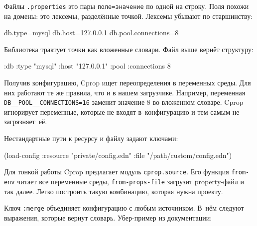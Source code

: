 
\begin{english}
\end{english}

Файлы \verb|.properties| это пары \verb|поле=значение| по одной на
строку. Поля похожи на домены: это лексемы, разделённые точкой. Лексемы убывают
по старшинству:

\begin{english}
  \begin{ini}
db.type=mysql
db.host=127.0.0.1
db.pool.connections=8
  \end{ini}
\end{english}

Библиотека трактует точки как вложенные словари. Файл выше вернёт структуру:

\begin{english}
  \begin{clojure}
{:db {:type "mysql"
      :host "127.0.0.1"
      :pool {:connections 8}}}
  \end{clojure}
\end{english}

Получив конфигурацию, Cprop ищет переопределения в переменных среды. Для них
работают те же правила, что и в нашем загрузчике. Например, переменная
\verb|DB__POOL__CONNECTIONS=16| заменит значение 8 во вложенном словаре. Cprop
игнорирует переменные, которые не входят в~конфигурацию и тем самым не
загрязняет~её.

Нестандартные пути к ресурсу и файлу задают ключами:

\begin{english}
  \begin{clojure}
(load-config
 :resource "private/config.edn"
 :file "/path/custom/config.edn")
  \end{clojure}
\end{english}


Для тонкой работы Cprop предлагает модуль \verb|cprop.source|. Его функция
\verb|from-env| читает все переменные среды, \verb|from-props-file| загрузит
property-файл и так далее. Легко построить такую комбинацию, которая нужна
проекту.

Ключ \verb|:merge| объединяет конфигурацию с любым источником. В~нём
следуют выражения, которые вернут словарь. Убер-пример из документации:

